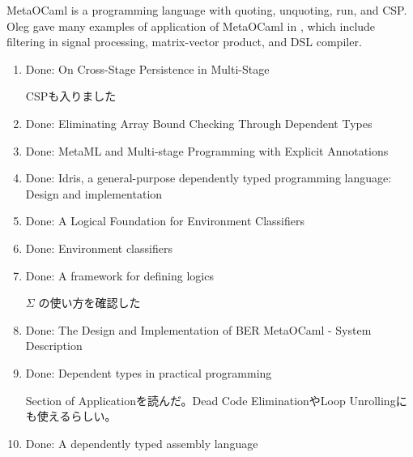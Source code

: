 \documentclass[runningheads]{llncs}
\begin{document}

MetaOCaml is a programming language with quoting, unquoting, run, and CSP.
Oleg gave many examples of application of MetaOCaml in \cite{8384206}, 
which include filtering in signal processing, matrix-vector product, and DSL compiler.

\begin{enumerate}
	\item Done: On Cross-Stage Persistence in Multi-Stage\cite{Hanada2014}
	      
	      CSPも入りました
	\item Done: Eliminating Array Bound Checking Through Dependent Types\cite{Xi98}
	\item Done: MetaML and Multi-stage Programming with Explicit Annotations\cite{MetaML}
	\item Done: Idris, a general-purpose dependently typed programming language: Design and implementation\cite{brady2013idris}
	\item Done: A Logical Foundation for Environment Classifiers\cite{Tsukada}
	\item Done: Environment classifiers\cite{taha2003environment}
	\item Done: A framework for defining logics\cite{harper1993framework}
	      
	      $\Sigma$ の使い方を確認した
	\item Done: The Design and Implementation of {BER} MetaOCaml - System Description\cite{oleg2014}
	\item Done: Dependent types in practical programming\cite{xi1999dependent}
	      
	      Section of Applicationを読んだ。Dead Code EliminationやLoop Unrollingにも使えるらしい。
	      
	\item Done: A dependently typed assembly language\cite{xi2001dependently}
	      

\end{enumerate}
\end{document}

